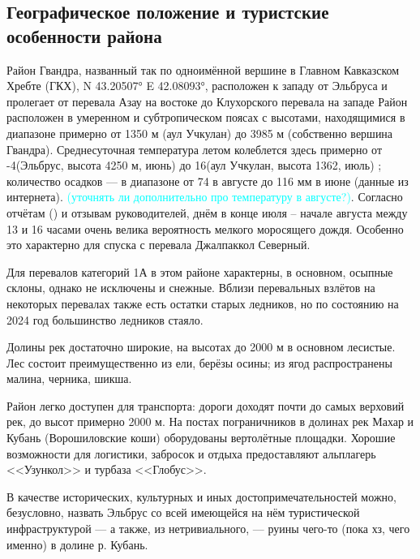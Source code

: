 \newpage

\subsection{Географическое положение и туристские особенности района}
Район Гвандра, названный так по одноимённой вершине в Главном Кавказском Хребте (ГКХ), N 43.20507° E 42.08093°,  расположен к западу от Эльбруса и пролегает от перевала Азау на востоке до Клухорского перевала на западе \cite{ZakharovGvandra} Район расположен в умеренном и субтропическом поясах с высотами, находящимися в диапазоне примерно от 1350 м (аул Учкулан) до 3985 м (собственно вершина Гвандра). Среднесуточная температура летом колеблется здесь примерно от -4\degree (Эльбрус, высота 4250 м, июнь) до 16\degree (аул Учкулан, высота 1362, июль) \cite{Shalnev2020}; количество осадков — в диапазоне от 74 в августе до 116 мм в июне (данные из интернета). \textcolor{cyan}{(уточнять ли дополнительно про температуру в августе?)}. Согласно отчётам (\cite{Brunarsky2023, Sevidov 2021}) и отзывам руководителей, днём в конце июля – начале августа между 13 и 16 часами очень велика вероятность мелкого моросящего дождя. Особенно это характерно для спуска с перевала Джалпаккол Северный.

Для перевалов категорий 1А в этом районе характерны, в основном, осыпные склоны, однако не исключены и снежные. Вблизи перевальных взлётов на некоторых перевалах также есть остатки старых ледников, но по состоянию на 2024 год большинство ледников  стаяло. 

Долины рек достаточно широкие, на высотах до 2000 м в основном лесистые. Лес состоит преимущественно из ели, берёзы осины; из ягод распространены малина, черника, шикша. 

Район легко доступен для транспорта: дороги доходят почти до самых верховий рек, до высот примерно 2000 м. На постах пограничников в долинах рек Махар и Кубань (Ворошиловские коши) оборудованы вертолётные площадки. Хорошие возможности для логистики, забросок и отдыха предоставляют альплагерь <<Узункол>> и турбаза <<Глобус>>. 

В качестве исторических, культурных и иных достопримечательностей можно, безусловно, назвать Эльбрус со всей имеющейся на нём туристической инфраструктурой — а также, из нетривиального, — руины чего-то (пока хз, чего именно) в долине р. Кубань. 

\clearpage
